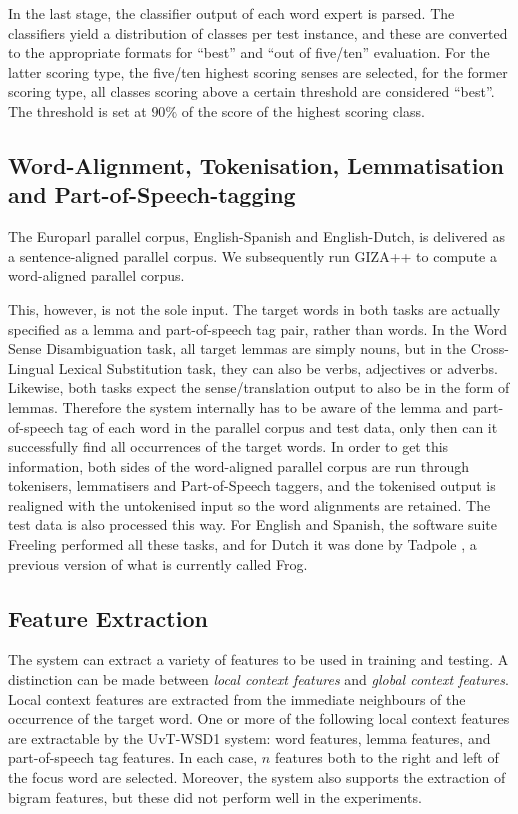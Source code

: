 In the last stage, the classifier output of each word expert is parsed. The
classifiers yield a distribution of classes per test instance, and these are
converted to the appropriate formats for ``best'' and ``out of five/ten''
evaluation. For the latter scoring type, the five/ten highest scoring senses
are selected, for the former scoring type, all classes scoring above a certain
threshold are considered ``best''. The threshold is set at $90\%$ of the score
of the highest scoring class.

\subsection{Word-Alignment, Tokenisation, Lemmatisation and Part-of-Speech-tagging}

The Europarl parallel corpus, English-Spanish and English-Dutch, is delivered
as a sentence-aligned parallel corpus. We subsequently run GIZA++ \citep{GIZA}
to compute a word-aligned parallel corpus.

This, however, is not the sole input. The target words in both tasks are
actually specified as a lemma and part-of-speech tag pair, rather than words.
In the Word Sense Disambiguation task, all target lemmas are simply nouns, but
in the Cross-Lingual Lexical Substitution task, they can also be verbs,
adjectives or adverbs. Likewise, both tasks expect the sense/translation output
to also be in the form of lemmas. Therefore the system internally has to be
aware of the lemma and part-of-speech tag of each word in the parallel corpus
and test data, only then can it successfully find all occurrences of the target
words. In order to get this information, both sides of the word-aligned
parallel corpus are run through tokenisers, lemmatisers and Part-of-Speech
taggers, and the tokenised output is realigned with the untokenised input so
the word alignments are retained. The test data is also processed this way. For
English and Spanish, the software suite Freeling \citep{FREELING} performed all
these tasks, and for Dutch it was done by Tadpole \citep{TADPOLE}, a previous
version of what is currently called Frog.

\subsection{Feature Extraction}
\label{sec:features}

The system can extract a variety of features to be used in training and
testing. A distinction can be made between \emph{local context features} and
\emph{global context features}. Local context features are extracted from the
immediate neighbours of the occurrence of the target word. One or more of the
following local context features are extractable by the UvT-WSD1 system: word
features, lemma features, and part-of-speech tag features. In each case, $n$
features both to the right and left of the focus word are selected. Moreover,
the system also supports the extraction of bigram features, but these did not
perform well in the experiments.

